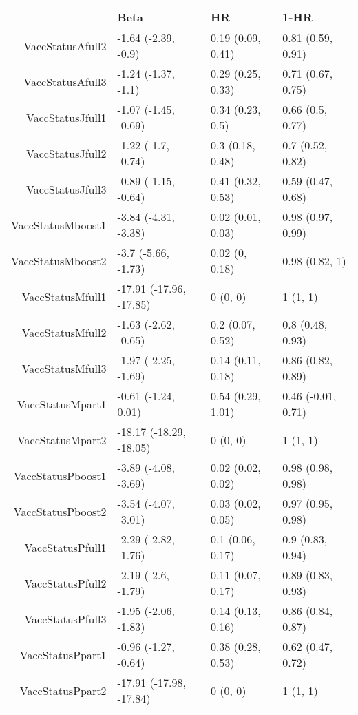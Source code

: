 \begin{table}[ht]
\centering
\begin{tabular}{rlll}
  \hline
 & Beta & HR & 1-HR \\ 
  \hline
VaccStatusAfull2 & -1.64 (-2.39, -0.9) & 0.19 (0.09, 0.41) & 0.81 (0.59, 0.91) \\ 
  VaccStatusAfull3 & -1.24 (-1.37, -1.1) & 0.29 (0.25, 0.33) & 0.71 (0.67, 0.75) \\ 
  VaccStatusJfull1 & -1.07 (-1.45, -0.69) & 0.34 (0.23, 0.5) & 0.66 (0.5, 0.77) \\ 
  VaccStatusJfull2 & -1.22 (-1.7, -0.74) & 0.3 (0.18, 0.48) & 0.7 (0.52, 0.82) \\ 
  VaccStatusJfull3 & -0.89 (-1.15, -0.64) & 0.41 (0.32, 0.53) & 0.59 (0.47, 0.68) \\ 
  VaccStatusMboost1 & -3.84 (-4.31, -3.38) & 0.02 (0.01, 0.03) & 0.98 (0.97, 0.99) \\ 
  VaccStatusMboost2 & -3.7 (-5.66, -1.73) & 0.02 (0, 0.18) & 0.98 (0.82, 1) \\ 
  VaccStatusMfull1 & -17.91 (-17.96, -17.85) & 0 (0, 0) & 1 (1, 1) \\ 
  VaccStatusMfull2 & -1.63 (-2.62, -0.65) & 0.2 (0.07, 0.52) & 0.8 (0.48, 0.93) \\ 
  VaccStatusMfull3 & -1.97 (-2.25, -1.69) & 0.14 (0.11, 0.18) & 0.86 (0.82, 0.89) \\ 
  VaccStatusMpart1 & -0.61 (-1.24, 0.01) & 0.54 (0.29, 1.01) & 0.46 (-0.01, 0.71) \\ 
  VaccStatusMpart2 & -18.17 (-18.29, -18.05) & 0 (0, 0) & 1 (1, 1) \\ 
  VaccStatusPboost1 & -3.89 (-4.08, -3.69) & 0.02 (0.02, 0.02) & 0.98 (0.98, 0.98) \\ 
  VaccStatusPboost2 & -3.54 (-4.07, -3.01) & 0.03 (0.02, 0.05) & 0.97 (0.95, 0.98) \\ 
  VaccStatusPfull1 & -2.29 (-2.82, -1.76) & 0.1 (0.06, 0.17) & 0.9 (0.83, 0.94) \\ 
  VaccStatusPfull2 & -2.19 (-2.6, -1.79) & 0.11 (0.07, 0.17) & 0.89 (0.83, 0.93) \\ 
  VaccStatusPfull3 & -1.95 (-2.06, -1.83) & 0.14 (0.13, 0.16) & 0.86 (0.84, 0.87) \\ 
  VaccStatusPpart1 & -0.96 (-1.27, -0.64) & 0.38 (0.28, 0.53) & 0.62 (0.47, 0.72) \\ 
  VaccStatusPpart2 & -17.91 (-17.98, -17.84) & 0 (0, 0) & 1 (1, 1) \\ 

\end{tabular}
\end{table}
